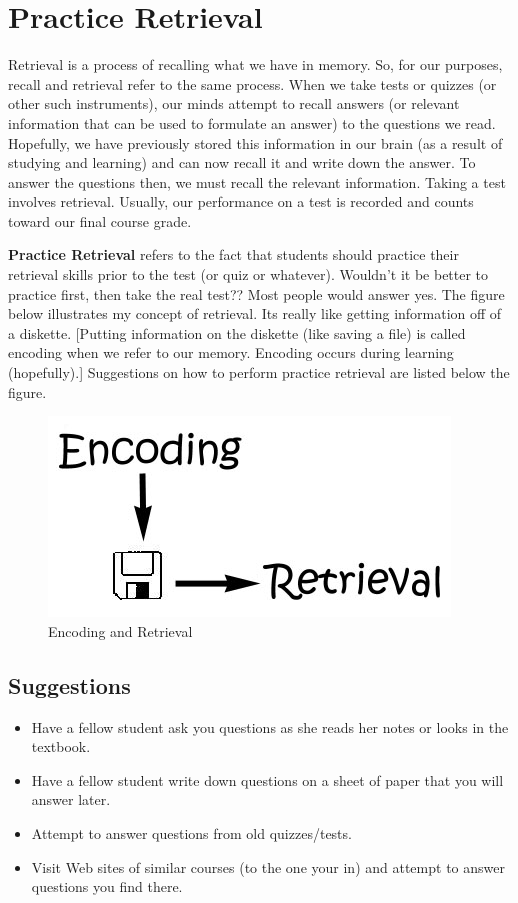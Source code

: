 \chapter{Practice Retrieval}

Retrieval is a process of recalling what we have in memory. So, for our purposes, recall and retrieval refer to the same process. When we take tests or quizzes (or other such instruments), our minds attempt to recall answers (or relevant information that can be used to formulate an answer) to the questions we read.  Hopefully, we have previously stored this information in our brain (as a result of studying and learning) and can now recall it and write down the answer. To answer the questions then, we must recall the relevant information. Taking a test involves retrieval. Usually, our performance on a test is recorded and counts toward our final course grade.

\textbf{Practice Retrieval} refers to the fact that students should practice their retrieval skills prior to the test (or quiz or whatever). Wouldn't it be better to practice first, then take the real test?? Most people would answer yes. The figure below illustrates my concept of retrieval. Its really like getting information off of a diskette. [Putting information on the diskette (like saving a file) is called encoding when we refer to our memory. Encoding occurs during learning (hopefully).] Suggestions on how to perform practice retrieval are listed below the figure.

\begin{figure}
	\centering
	\includegraphics[width=0.55\linewidth]{./images/practice}
	\caption{Encoding and Retrieval}
	\label{fig:practice}
\end{figure}

\section{Suggestions}

\begin{itemize}
	\item Have a fellow student ask you questions as she reads her notes or looks in the textbook.
	\item Have a fellow student write down questions on a sheet of paper that you will answer later.
	\item Attempt to answer questions from old quizzes/tests.
	\item Visit Web sites of similar courses (to the one your in) and attempt to answer questions you find there.
\end{itemize}